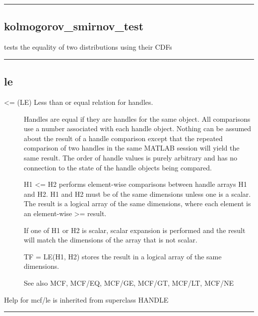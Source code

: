 \documentclass[letterpaper,10pt,english]{sphinxmanual}
\begin{document}
\bigskip\hrule{}\bigskip



\subsection{kolmogorov\_smirnov\_test}
\label{classes/utils/@mcf/mcf:id4}\label{classes/utils/@mcf/mcf:kolmogorov-smirnov-test}
tests the equality of two distributions using their CDFs


\bigskip\hrule{}\bigskip



\subsection{le}
\label{classes/utils/@mcf/mcf:le}\label{classes/utils/@mcf/mcf:id5}\begin{description}
\item[{\textless{}= (LE)   Less than or equal relation for handles.}] \leavevmode
Handles are equal if they are handles for the same object.  All
comparisons use a number associated with each handle object.  Nothing
can be assumed about the result of a handle comparison except that the
repeated comparison of two handles in the same MATLAB session will
yield the same result.  The order of handle values is purely arbitrary
and has no connection to the state of the handle objects being
compared.

H1 \textless{}= H2 performs element-wise comparisons between handle arrays H1 and
H2.  H1 and H2 must be of the same dimensions unless one is a scalar.
The result is a logical array of the same dimensions, where each
element is an element-wise \textgreater{}= result.

If one of H1 or H2 is scalar, scalar expansion is performed and the
result will match the dimensions of the array that is not scalar.

TF = LE(H1, H2) stores the result in a logical array of the same
dimensions.

See also MCF, MCF/EQ, MCF/GE, MCF/GT, MCF/LT, MCF/NE

\end{description}

Help for mcf/le is inherited from superclass HANDLE


\bigskip\hrule{}\bigskip
\end{document}
